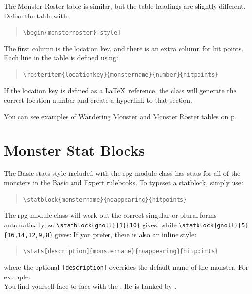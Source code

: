 \documentclass[letterpaper,serif]{rpg-module}
\begin{document}
The Monster Roster table is similar, but the table headings are slightly different. Define the table with:
\begin{quote}
\verb|\begin{monsterroster}[style]|
\end{quote}
The first column is the location key, and there is an extra column for hit points. Each line in
the table is defined using:
\begin{quote}
\hspace{-2em}\verb|\rosteritem{locationkey}{monstername}{number}{hitpoints}|
\end{quote}
If the location key is defined as a \LaTeX~reference, the class will generate the correct location number and create a hyperlink to that section.

You can see examples of Wandering Monster and Monster Roster tables on p.\pageref{wanderingmonsters}.

\section{Monster Stat Blocks}
\label{stat_blocks}

The Basic stats style included with the rpg-module class has stats for all of the monsters in the Basic and Expert rulebooks.
To typeset a statblock, simply use:
\begin{quote}
\verb|\statblock{monstername}{noappearing}{hitpoints}|
\end{quote}
The rpg-module class will work out the correct singular or plural forms automatically, so
\verb|\statblock{gnoll}{1}{10}| gives:
while \verb|\statblock{gnoll}{5}{16,14,12,9,8}| gives:
If you prefer, there is also an inline style:
\begin{quote}
\hspace{-2em}\verb|\stats[description]{monstername}{noappearing}{hitpoints}|
\end{quote}
where the optional \verb|[description]| overrides the default name of the monster.
For example:\\[0.1em]

\noindent You find yourself face to face with the . He is flanked
by .\\[0.1em]
\end{document}
